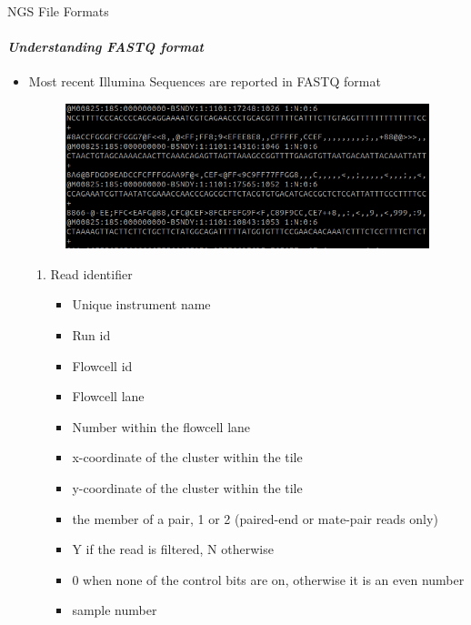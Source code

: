 \documentclass{if-beamer}
\begin{document}
\begin{frame}{NGS File Formats}
\framesubtitle{\emph{Understanding FASTQ format}}
\begin{itemize}
    \item Most recent Illumina Sequences are reported in FASTQ format
    \begin{figure}
    \centering
    \includegraphics[scale=0.5]{fastq.PNG}
    \end{figure}
    \begin{enumerate}
        \item Read identifier
        \begin{itemize}
            \item Unique instrument name
            \item Run id
            \item Flowcell id
            \item Flowcell lane
            \item Number within the flowcell lane
            \item x-coordinate of the cluster within the tile
            \item y-coordinate of the cluster within the tile
            \item the member of a pair, 1 or 2 (paired-end or mate-pair reads only)
            \item Y if the read is filtered, N otherwise
            \item 0 when none of the control bits are on, otherwise it is an even number
            \item sample number
        \end{itemize}
    \end{enumerate}
\end{itemize} 
\end{frame}
\end{document}
